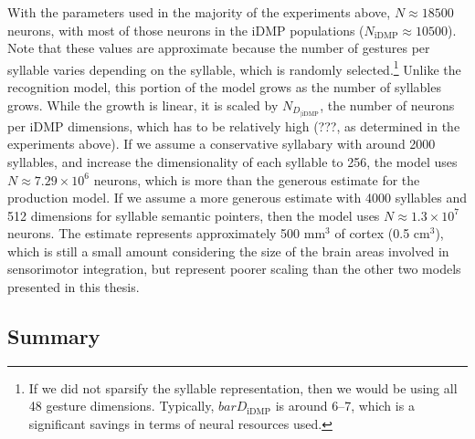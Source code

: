 With the parameters used
in the majority of the experiments above,
$N\approx18500$ neurons,
with most of those neurons
in the iDMP populations
($N_{\text{iDMP}}\approx10500$).
Note that these values are approximate
because the number of gestures per syllable
varies depending on the syllable,
which is randomly selected.\footnote{
  If we did not sparsify the syllable representation,
  then we would be using all 48 gesture dimensions.
  Typically, $bar{D_{\text{iDMP}}}$ is around 6--7,
  which is a significant savings in terms
  of neural resources used.}
Unlike the recognition model,
this portion of the model
grows as the number of syllables grows.
While the growth is linear,
it is scaled by $N_D_{|\text{iDMP}}$,
the number of neurons per iDMP dimensions,
which has to be relatively high
(???, as determined in the experiments above).
If we assume a conservative syllabary
with around 2000 syllables,
and increase the dimensionality
of each syllable to 256,
the model uses
$N \approx 7.29 \times 10^6$ neurons,
which is more than the generous
estimate for the production model.
If we assume a more generous estimate
with 4000 syllables
and 512 dimensions
for syllable semantic pointers,
then the model uses
$N \approx 1.3 \times 10^7$ neurons.
The estimate represents approximately
500 mm$^3$ of cortex (0.5 cm$^3$),
which is still a small amount
considering the size of the brain areas
involved in sensorimotor integration,
but represent poorer scaling
than the other two models presented in this thesis.

\subsection{Summary}

